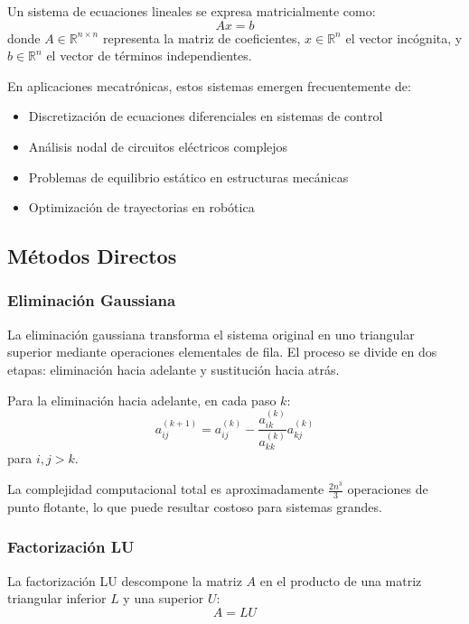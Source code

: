 \documentclass[conference]{IEEEtran}
\begin{document}
Un sistema de ecuaciones lineales se expresa matricialmente como:
\begin{equation}
Ax = b
\end{equation}
donde $A \in \mathbb{R}^{n \times n}$ representa la matriz de coeficientes, $x \in \mathbb{R}^n$ el vector incógnita, y $b \in \mathbb{R}^n$ el vector de términos independientes.

En aplicaciones mecatrónicas, estos sistemas emergen frecuentemente de:
\begin{itemize}
    \item Discretización de ecuaciones diferenciales en sistemas de control
    \item Análisis nodal de circuitos eléctricos complejos
    \item Problemas de equilibrio estático en estructuras mecánicas
    \item Optimización de trayectorias en robótica
\end{itemize}

\subsection{Métodos Directos}

\subsubsection{Eliminación Gaussiana}
La eliminación gaussiana transforma el sistema original en uno triangular superior mediante operaciones elementales de fila. El proceso se divide en dos etapas: eliminación hacia adelante y sustitución hacia atrás.

Para la eliminación hacia adelante, en cada paso $k$:
\begin{equation}
a_{ij}^{(k+1)} = a_{ij}^{(k)} - \frac{a_{ik}^{(k)}}{a_{kk}^{(k)}} a_{kj}^{(k)}
\end{equation}
para $i, j > k$.

La complejidad computacional total es aproximadamente $\frac{2n^3}{3}$ operaciones de punto flotante, lo que puede resultar costoso para sistemas grandes.

\subsubsection{Factorización LU}
La factorización LU descompone la matriz $A$ en el producto de una matriz triangular inferior $L$ y una superior $U$:
\begin{equation}
A = LU
\end{equation}
\end{document}

